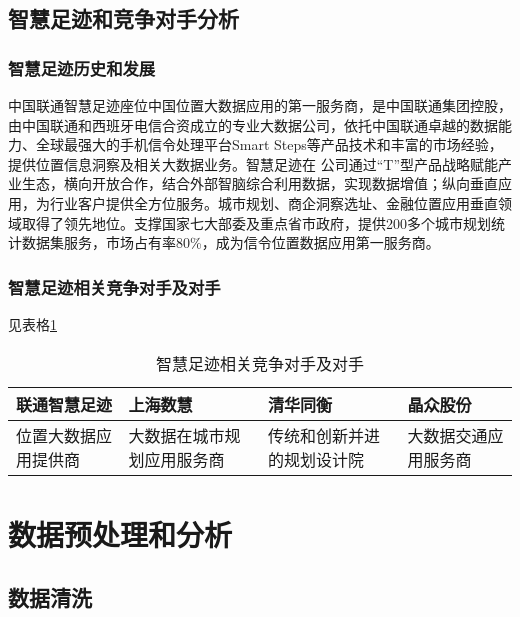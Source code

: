 \subsection{智慧足迹和竞争对手分析}
\subsubsection*{智慧足迹历史和发展}
中国联通智慧足迹座位中国位置大数据应用的第一服务商，是中国联通集团控股，由中国联通和西班牙电信合资成立的专业大数据公司，依托中国联通卓越的数据能力、全球最强大的手机信令处理平台Smart Steps等产品技术和丰富的市场经验，提供位置信息洞察及相关大数据业务。智慧足迹在
公司通过“T”型产品战略赋能产业生态，横向开放合作，结合外部智脑综合利用数据，实现数据增值；纵向垂直应用，为行业客户提供全方位服务。城市规划、商企洞察选址、金融位置应用垂直领域取得了领先地位。支撑国家七大部委及重点省市政府，提供200多个城市规划统计数据集服务，市场占有率80\%，成为信令位置数据应用第一服务商。
\subsubsection*{智慧足迹相关竞争对手及对手}
见表格\ref{table:1}
\begin{table}
\centering
\caption{智慧足迹相关竞争对手及对手}
\label{table:1}
\begin{tabular}{p{}|p{}|p{}|p{}}
\hline
\hline
联通智慧足迹 & 上海数慧 & 清华同衡 & 晶众股份\\
\hline
位置大数据应用提供商&大数据在城市规划应用服务商&传统和创新并进的规划设计院&大数据交通应用服务商\\
\hline
\hline
\end{tabular}
\end{table}
\section{数据预处理和分析}
\subsection{数据清洗}
